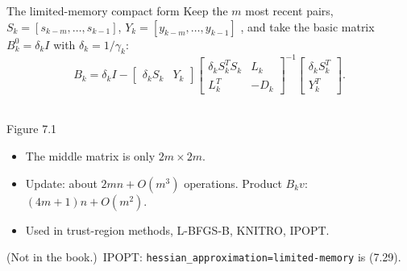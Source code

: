 \documentclass[aspectratio=169,12pt]{beamer}
\newcommand{\eqn}[1]{\text{\small(#1)}}
\newcommand{\notinbook}{{\small(Not in the book.)}}
\begin{document}
\begin{frame}{The limited-memory compact form}
  Keep the $m$ most recent pairs, $S_{k}=[s_{k-m},\dots,s_{k-1}]$, $Y_{k}=[y_{k-m},\dots,y_{k-1}]$ \eqn{7.28},
  and take the basic matrix $B_{k}^{0}=\delta_{k}I$ with $\delta_{k}=1/\gamma_{k}$:
  \[
    B_{k}=\delta_{k}I-\begin{bmatrix}\delta_{k}S_{k}&Y_{k}\end{bmatrix}
    \begin{bmatrix}\delta_{k}S_{k}^{T}S_{k}&L_{k}\\ L_{k}^{T}&-D_{k}\end{bmatrix}^{-1}
    \begin{bmatrix}\delta_{k}S_{k}^{T}\\ Y_{k}^{T}\end{bmatrix} .
    \tag{7.29}
  \]

  \begin{minipage}[c]{0.40\textwidth}
    \centering
    \\
    {\small Figure 7.1}
  \end{minipage}\hfill
  \begin{minipage}[c]{0.58\textwidth}
    \begin{itemize}\setlength\itemsep{0.15em}
      \item The middle matrix is only $2m\times 2m$.
      \item Update: about $2mn+O(m^{3})$ operations.
        Product $B_{k}v$: $(4m+1)n+O(m^{2})$.
      \item Used in trust-region methods, L-BFGS-B, KNITRO, IPOPT.
    \end{itemize}
  \end{minipage}

  \vspace{0.4em}
  \notinbook\ IPOPT: \texttt{hessian\_approximation=limited-memory} is (7.29).
\end{frame}
\end{document}
